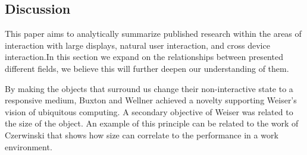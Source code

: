 \subsection{Discussion}
This paper aims to analytically summarize published research within the areas of interaction with large displays, natural user interaction, and cross device interaction.In this section we expand on the relationships between presented different fields, we believe this will further deepen our understanding of them.

By making the objects that surround us change their non-interactive state to a responsive medium, Buxton\cite{Buxton:2000} and Wellner\cite{Wellner:1993} achieved a novelty supporting Weiser's vision of ubiquitous computing. A secondary objective of Weiser was related to the size of the object. An example of this principle can be related to the work of Czerwinski\cite{Czerwinski:2003} that shows how size can correlate to the performance in a work environment.

